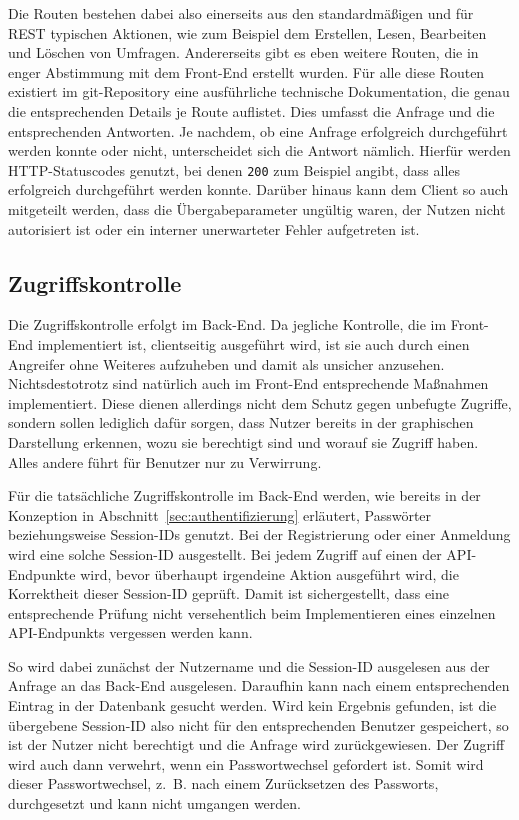 Die Routen bestehen dabei also einerseits aus den standardmäßigen und für \acs{REST} typischen Aktionen, wie zum Beispiel dem Erstellen, Lesen, Bearbeiten und Löschen von Umfragen.
Andererseits gibt es eben weitere Routen, die in enger Abstimmung mit dem Front-End erstellt wurden.
Für alle diese Routen existiert im git-Repository eine ausführliche technische Dokumentation, die genau die entsprechenden Details je Route auflistet.
Dies umfasst die Anfrage und die entsprechenden Antworten.
Je nachdem, ob eine Anfrage erfolgreich durchgeführt werden konnte oder nicht, unterscheidet sich die Antwort nämlich.
Hierfür werden \acs{HTTP}-Statuscodes genutzt, bei denen \texttt{200} zum Beispiel angibt, dass alles erfolgreich durchgeführt werden konnte.
Darüber hinaus kann dem Client so auch mitgeteilt werden, dass die Übergabeparameter ungültig waren, der Nutzen nicht autorisiert ist oder ein interner unerwarteter Fehler aufgetreten ist.\autocite[Vgl.][S. 51 ff]{nl-rfc7231}

\subsection{Zugriffskontrolle}
Die Zugriffskontrolle erfolgt im Back-End.
Da jegliche Kontrolle, die im Front-End implementiert ist, clientseitig ausgeführt wird, ist sie auch durch einen Angreifer ohne Weiteres aufzuheben und damit als unsicher anzusehen.
Nichtsdestotrotz sind natürlich auch im Front-End entsprechende Maßnahmen implementiert.
Diese dienen allerdings nicht dem Schutz gegen unbefugte Zugriffe, sondern sollen lediglich dafür sorgen, dass Nutzer bereits in der graphischen Darstellung erkennen, wozu sie berechtigt sind und worauf sie Zugriff haben.
Alles andere führt für Benutzer nur zu Verwirrung.

Für die tatsächliche Zugriffskontrolle im Back-End werden, wie bereits in der Konzeption in Abschnitt~\ref{sec:authentifizierung} erläutert, Passwörter beziehungsweise Session-IDs genutzt.
Bei der Registrierung oder einer Anmeldung wird eine solche Session-ID ausgestellt.
Bei jedem Zugriff auf einen der \acs{API}-Endpunkte wird, bevor überhaupt irgendeine Aktion ausgeführt wird, die Korrektheit dieser Session-ID geprüft.
Damit ist sichergestellt, dass eine entsprechende Prüfung nicht versehentlich beim Implementieren eines einzelnen \acs{API}-Endpunkts vergessen werden kann.

So wird dabei zunächst der Nutzername und die Session-ID ausgelesen aus der Anfrage an das Back-End ausgelesen.
Daraufhin kann nach einem entsprechenden Eintrag in der Datenbank gesucht werden.
Wird kein Ergebnis gefunden, ist die übergebene Session-ID also nicht für den entsprechenden Benutzer gespeichert, so ist der Nutzer nicht berechtigt und die Anfrage wird zurückgewiesen.
Der Zugriff wird auch dann verwehrt, wenn ein Passwortwechsel gefordert ist.
Somit wird dieser Passwortwechsel, z.~B. nach einem Zurücksetzen des Passworts, durchgesetzt und kann nicht umgangen werden.

